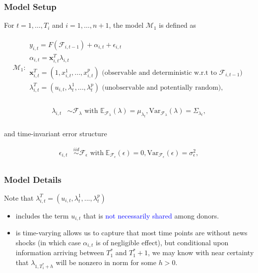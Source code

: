\documentclass[9pt]{beamer}
\newcommand{\x}{\textbf{x}}
\newcommand{\simiid}{\stackrel{iid}{\sim}} %
\def\mrm#1{\mathrm{#1}} %
\def\mc#1{\mathcal{#1}} %
\def\E{\mathbb{E}} %
\def\mc#1{\mathcal{#1}}
\theoremstyle{definition}
\begin{document}
    \begin{frame}\frametitle{Model Setup}
    
    \fontsize{8}{7.2}
    
    For $t= 1, \ldots, T_i$ and $i = 1, \ldots, n+1$, the model $\mc{M}_1$ is defined as 

    \begin{align}
        \mc{M}_1 \colon 
    \begin{array}{l}
          y_{i,t} = F(\mathcal{F}_{i,t-1}) + \alpha_{i,t} + \epsilon_{i,t}\\[.2cm]
          \alpha_{i,t} = \x^{T}_{i,t}\lambda_{i,t} \\[.2cm]
         \x_{i,t}^{T} = (1,x^{1}_{i,t},...,x^{p}_{i,t}) \text{ (observable and deterministic w.r.t to } \mathcal{F}_{i,t-1})\\[.2cm] 
         \lambda_{i,t}^{T} = (u_{i,t},\lambda^{1}_{t},...,\lambda^{p}_{t}) \text{ (unobservable and potentially random)},\\[.2cm]
        \end{array}
    \end{align}

    \begin{align*}
    \lambda_{i,t} &\sim \mc{F}_{\lambda}\text{ with }  \E_{\mathcal{F}_{\lambda}}(\lambda) = \mu_{\lambda_{t}}, \mrm{Var}_{\mc{F}_{\lambda}}(\lambda) = \Sigma_{\lambda_{t}},\\
    \end{align*}

    and time-invariant error structure

    \begin{align*}
        \epsilon_{i,t} &\simiid \mc{F}_{\epsilon} \text{ with}  \; \E_{\mc{F}_{\epsilon}}(\epsilon) = 0, \mrm{Var}_{\mc{F}_{\epsilon}}(\epsilon)  = \sigma^{2}_{\epsilon},  \\
    \end{align*}
    
    \end{frame}

    \begin{frame}\frametitle{Model Details}
        Note that $\lambda_{i,t}^{T} = (u_{i,t},\lambda^{1}_{t},...,\lambda^{p}_{t})$
        \begin{itemize}
            
            \item includes the term $u_{i,t}$ that is \textcolor{blue}{not necessarily shared} among donors.
            \item is time-varying allows us to capture that most time points are without news shocks (in which case $\alpha_{i,t}$ is of negligible effect), but conditional upon information arriving between $T_{1}^{*}$ and $T_{1}^{*}+1$, we may know with near certainty that $\lambda_{1,T_{1}^{*}+h}$ will be nonzero in norm for some $h>0$. 
        \end{itemize}
    \end{frame}
    
\end{document}
